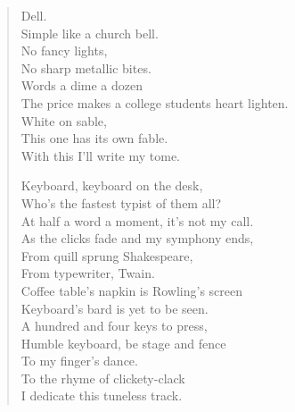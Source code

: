 \documentclass[12pt,letterpaper]{article}
\begin{document}
\begin{verse}
Dell.\\ 
Simple like a church bell.\\ 
No fancy lights,\\ 
No sharp metallic bites.\\ 
Words a dime a dozen\\ 
The price makes a college students heart lighten.\\ 
White on sable,\\ 
This one has its own fable.\\ 
With this I'll write my tome. 
 
Keyboard, keyboard on the desk,\\ 
Who's the fastest typist of them all?\\ 
At half a word a moment, it's not my call.\\ 
As the clicks fade and my symphony ends,\\ 

From quill sprung Shakespeare,\\ 
From typewriter, Twain.\\ 
Coffee table's napkin is Rowling's screen\\ 
Keyboard's bard is yet to be seen.\\ 

A hundred and four keys to press,\\ 
Humble keyboard, be stage and fence\\ 
To my finger's dance.\\ 
To the rhyme of clickety-clack\\ 
I dedicate this tuneless track. 
\end{verse}

\end{document}

